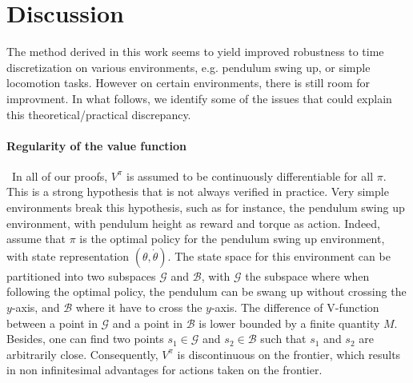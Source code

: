 \section{Discussion}
\label{sec:discussions}

The method derived in this work seems to yield improved robustness to
time discretization on various environments, e.g. pendulum swing up, or
simple locomotion tasks.  However on certain environments, there is still
room for improvment. In what follows, we identify some of the issues
that could explain this theoretical/practical discrepancy.

\paragraph{Regularity of the value function}~In all of our proofs, $V^\pi$ is
assumed to be continuously differentiable for all $\pi$.  This is a strong
hypothesis that is not always verified in practice. Very simple environments
break this hypothesis, such as for instance, the pendulum swing up environment,
with pendulum height as reward and torque as action.  Indeed, assume that $\pi$
is the optimal policy for the pendulum swing up environment, with state
representation $(\theta, \dot{\theta})$. The state space for this environment
can be partitioned into two subspaces $\mathcal{G}$ and $\mathcal{B}$, with
$\mathcal{G}$ the subspace where when following the optimal policy, the
pendulum can be swang up without crossing the $y$-axis, and $\mathcal{B}$ where
it have to cross the $y$-axis. The difference of V-function between a point in
$\mathcal{G}$ and a point in $\mathcal{B}$ is lower bounded by a finite
quantity $M$. Besides, one can find two points $s_1 \in \mathcal{G}$ and $s_2 \in \mathcal{B}$
such that $s_1$ and $s_2$ are arbitrarily close. Consequently, $V^\pi$ is
discontinuous on the frontier, which results in non infinitesimal advantages
for actions taken on the frontier. 

